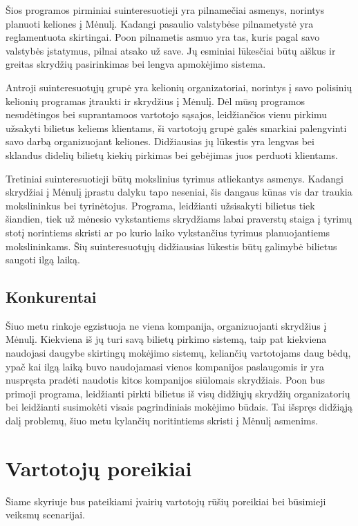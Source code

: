 \documentclass{VUMIFPSkursinis}
\begin{document}
Šios programos pirminiai suinteresuotieji yra pilnamečiai asmenys, norintys planuoti keliones į Mėnulį. Kadangi pasaulio valstybėse pilnametystė yra reglamentuota skirtingai. Poon pilnametis asmuo yra tas, kuris pagal savo valstybės įstatymus, pilnai atsako už save. Jų esminiai lūkesčiai būtų aiškus ir greitas skrydžių pasirinkimas bei lengva apmokėjimo sistema.

Antroji suinteresuotųjų grupė yra kelionių organizatoriai, norintys į savo polisinių kelionių programas įtraukti ir skrydžius į Mėnulį. Dėl mūsų programos nesudėtingos bei suprantamoos vartotojo sąsajos, leidžiančios vienu pirkimu užsakyti bilietus keliems klientams, ši vartotojų grupė galės smarkiai palengvinti savo darbą organizuojant keliones. Didžiausias jų lūkestis yra lengvas bei sklandus didelių bilietų kiekių pirkimas bei gebėjimas juos perduoti klientams.

Tretiniai suinteresuotieji būtų mokslinius tyrimus atliekantys asmenys. Kadangi skrydžiai į Mėnulį įprastu dalyku tapo neseniai, šis dangaus kūnas vis dar traukia mokslininkus bei tyrinėtojus. Programa, leidžianti užsisakyti bilietus tiek šiandien, tiek už mėnesio vykstantiems skrydžiams labai praverstų staiga į tyrimų stotį norintiems skristi ar po kurio laiko vykstančius tyrimus planuojantiems mokslininkams. Šių suinteresuotųjų didžiausias lūkestis būtų galimybė bilietus saugoti ilgą laiką.

\subsection{Konkurentai}
Šiuo metu rinkoje egzistuoja ne viena kompanija, organizuojanti skrydžius į Mėnulį. Kiekviena iš jų turi savą bilietų pirkimo sistemą, taip pat kiekviena naudojasi daugybe skirtingų mokėjimo sistemų, keliančių vartotojams daug bėdų, ypač kai ilgą laiką buvo naudojamasi vienos kompanijos paslaugomis ir yra nuspręsta pradėti naudotis kitos kompanijos siūlomais skrydžiais. Poon bus primoji programa, leidžianti pirkti bilietus iš visų didžiųjų skrydžių organizatorių bei leidžianti susimokėti visais pagrindiniais mokėjimo būdais. Tai išspręs didžiąją dalį problemų, šiuo metu kylančių noritintiems skristi į Mėnulį asmenims.

\section{Vartotojų poreikiai}
Šiame skyriuje bus pateikiami įvairių vartotojų rūšių poreikiai bei būsimieji veiksmų scenarijai.
\end{document}
